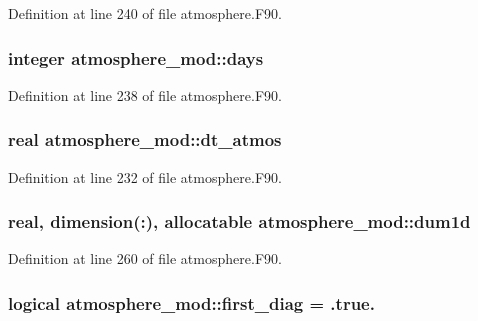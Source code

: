 Definition at line 240 of file atmosphere.\-F90.

\subsubsection[{days}]{\setlength{\rightskip}{0pt plus 5cm}integer atmosphere\-\_\-mod\-::days\hspace{0.3cm}{\ttfamily [private]}}\label{classatmosphere__mod_a110bc10bed586ca2cddc28ac924959a7}


Definition at line 238 of file atmosphere.\-F90.

\subsubsection[{dt\-\_\-atmos}]{\setlength{\rightskip}{0pt plus 5cm}real atmosphere\-\_\-mod\-::dt\-\_\-atmos\hspace{0.3cm}{\ttfamily [private]}}\label{classatmosphere__mod_a8bd26483e8952209607d542434d5a1f1}


Definition at line 232 of file atmosphere.\-F90.

\subsubsection[{dum1d}]{\setlength{\rightskip}{0pt plus 5cm}real, dimension(\-:), allocatable atmosphere\-\_\-mod\-::dum1d\hspace{0.3cm}{\ttfamily [private]}}\label{classatmosphere__mod_ab2d51769b2b98337ac742bc3f80d55a7}


Definition at line 260 of file atmosphere.\-F90.

\subsubsection[{first\-\_\-diag}]{\setlength{\rightskip}{0pt plus 5cm}logical atmosphere\-\_\-mod\-::first\-\_\-diag = .true.\hspace{0.3cm}{\ttfamily [private]}}\label{classatmosphere__mod_ad7cd98f866fa2b4b4f8528f385d7efc1}


